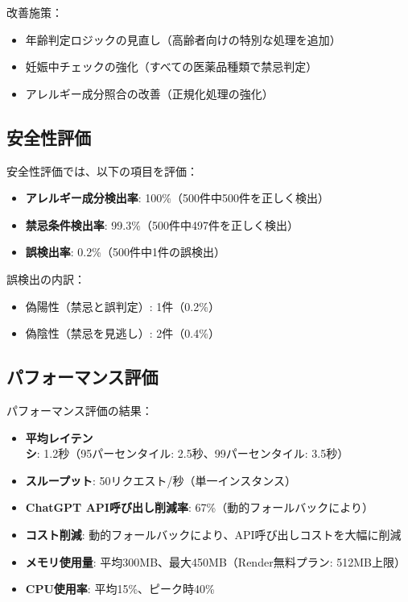 \documentclass[a4paper,11pt,ja=standard,xelatex]{bxjsarticle}
\theoremstyle{definition}
\begin{document}
改善施策：
\begin{itemize}
\item 年齢判定ロジックの見直し（高齢者向けの特別な処理を追加）
\item 妊娠中チェックの強化（すべての医薬品種類で禁忌判定）
\item アレルギー成分照合の改善（正規化処理の強化）
\end{itemize}

\subsection{安全性評価}

安全性評価では、以下の項目を評価：
\begin{itemize}
\item \textbf{アレルギー成分検出率}: 100\%（500件中500件を正しく検出）
\item \textbf{禁忌条件検出率}: 99.3\%（500件中497件を正しく検出）
\item \textbf{誤検出率}: 0.2\%（500件中1件の誤検出）
\end{itemize}

誤検出の内訳：
\begin{itemize}
\item 偽陽性（禁忌と誤判定）: 1件（0.2\%）
\item 偽陰性（禁忌を見逃し）: 2件（0.4\%）
\end{itemize}

\subsection{パフォーマンス評価}

パフォーマンス評価の結果：
\begin{itemize}
\item \textbf{平均レイテンシ}: 1.2秒（95パーセンタイル: 2.5秒、99パーセンタイル: 3.5秒）
\item \textbf{スループット}: 50リクエスト/秒（単一インスタンス）
\item \textbf{ChatGPT API呼び出し削減率}: 67\%（動的フォールバックにより）
\item \textbf{コスト削減}: 動的フォールバックにより、API呼び出しコストを大幅に削減
\item \textbf{メモリ使用量}: 平均300MB、最大450MB（Render無料プラン: 512MB上限）
\item \textbf{CPU使用率}: 平均15\%、ピーク時40\%
\end{itemize}
\end{document}
